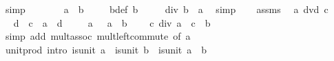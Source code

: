\begin{isabellebody}
\ simp\isanewline
\ \ \isamarkupfalse%
\ \isamarkupfalse%
\ {\isachardoublequoteopen}{}\ {\isacharequal}{\kern0pt}\ a\ {\isacharasterisk}{\kern0pt}\ b{\isachardoublequoteclose}\ \isacommand{{\isachardot}{\kern0pt}{\isachardot}{\kern0pt}}\isamarkupfalse%
\isanewline
\ \ \isamarkupfalse%
\ b{\isacharunderscore}{\kern0pt}def\ {\isacartoucheopen}b\ {\isasymnoteq}\ {}{\isacartoucheclose}\ \isamarkupfalse%
\ {\isachardoublequoteopen}{}\ div\ b\ {\isacharequal}{\kern0pt}\ a{\isachardoublequoteclose}\ \isamarkupfalse%
\ simp\isanewline
\ \ \isamarkupfalse%
\ assms\ \isamarkupfalse%
\ {\isachardoublequoteopen}a\ dvd\ c{\isachardoublequoteclose}\ \isacommand{{\isachardot}{\kern0pt}{\isachardot}{\kern0pt}}\isamarkupfalse%
\isanewline
\ \ \isamarkupfalse%
\ \isamarkupfalse%
\ d\ \ {\isachardoublequoteopen}c\ {\isacharequal}{\kern0pt}\ a\ {\isacharasterisk}{\kern0pt}\ d{\isachardoublequoteclose}\ \isacommand{{\isachardot}{\kern0pt}{\isachardot}{\kern0pt}}\isamarkupfalse%
\isanewline
\ \ \isamarkupfalse%
\ {\isacartoucheopen}a\ {\isasymnoteq}\ {}{\isacartoucheclose}\ {\isacartoucheopen}a\ {\isacharasterisk}{\kern0pt}\ b\ {\isacharequal}{\kern0pt}\ {}{\isacartoucheclose}\ \isamarkupfalse%
\ {\isachardoublequoteopen}c\ div\ a\ {\isacharequal}{\kern0pt}\ c\ {\isacharasterisk}{\kern0pt}\ b{\isachardoublequoteclose}\isanewline
\ \ \ \ \isamarkupfalse%
\ {\isacharparenleft}{\kern0pt}simp\ add{\isacharcolon}{\kern0pt}\ mult{\isachardot}{\kern0pt}assoc\ mult{\isachardot}{\kern0pt}left{\isacharunderscore}{\kern0pt}commute\ {\isacharbrackleft}{\kern0pt}of\ a{\isacharbrackright}{\kern0pt}{\isacharparenright}{\kern0pt}\isanewline
{}\isamarkupfalse%
%
\endisatagproof
{\isafoldproof}%
%
\isadelimproof
\isanewline
%
\endisadelimproof
\isanewline
{}\isamarkupfalse%
\ unit{\isacharunderscore}{\kern0pt}prod\ {\isacharbrackleft}{\kern0pt}intro{\isacharbrackright}{\kern0pt}{\isacharcolon}{\kern0pt}\ {\isachardoublequoteopen}is{\isacharunderscore}{\kern0pt}unit\ a\ {\isasymLongrightarrow}\ is{\isacharunderscore}{\kern0pt}unit\ b\ {\isasymLongrightarrow}\ is{\isacharunderscore}{\kern0pt}unit\ {\isacharparenleft}{\kern0pt}a\ {\isacharasterisk}{\kern0pt}\ b{\isacharparenright}{\kern0pt}{\isachardoublequoteclose}\isanewline
%
\isadelimproof
\ \ %
\endisadelimproof
%
\isatagproof
{}\isamarkupfalse%

\end{isabellebody}
